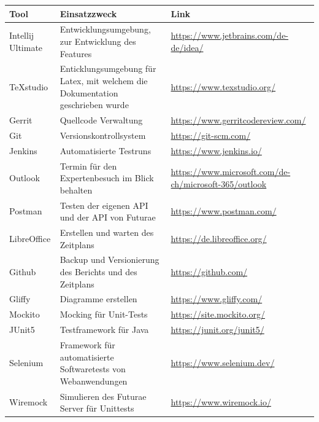 \renewcommand{\arraystretch}{1.5}
\begin{longtable}{|p{}|p{}|p{}|}
    \hline
    \textbf{Tool} & \textbf{Einsatzzweck} & \textbf{Link} \\ \hline
    Intellij Ultimate           & Entwicklungsumgebung, zur Entwicklung des Features                   & \url{https://www.jetbrains.com/de-de/idea/}     \\ \hline
    TeXstudio           & Enticklungsumgebung für Latex, mit welchem die Dokumentation geschrieben wurde & \url{https://www.texstudio.org/}     \\ \hline
    Gerrit           & Quellcode Verwaltung & \url{https://www.gerritcodereview.com/}     \\ \hline
    Git          & Versionskontrollsystem & \url{https://git-scm.com/}     \\ \hline
    Jenkins & Automatisierte Testruns  & \url{https://www.jenkins.io/}     \\ \hline
    Outlook & Termin für den Expertenbesuch im Blick behalten& \url{https://www.microsoft.com/de-ch/microsoft-365/outlook} \\ \hline
    Postman & Testen der eigenen API und der API von Futurae & \url{https://www.postman.com/} \\ \hline
    LibreOffice & Erstellen und warten des Zeitplans & \url{https://de.libreoffice.org/} \\ \hline
    Github & Backup und Versionierung des Berichts und des Zeitplans & \url{https://github.com/} \\ \hline
    Gliffy & Diagramme erstellen & \url{https://www.gliffy.com/} \\ \hline
    Mockito & Mocking für Unit-Tests& \url{https://site.mockito.org/} \\ \hline
    JUnit5 & Testframework für Java & \url{https://junit.org/junit5/} \\ \hline
    Selenium & Framework für automatisierte Softwaretests von Webanwendungen  & \url{https://www.selenium.dev/} \\ \hline
    Wiremock & Simulieren des Futurae Server für Unittests & \url{https://www.wiremock.io/} \\ \hline    
\end{longtable}
\renewcommand{\arraystretch}{1}
\newpage